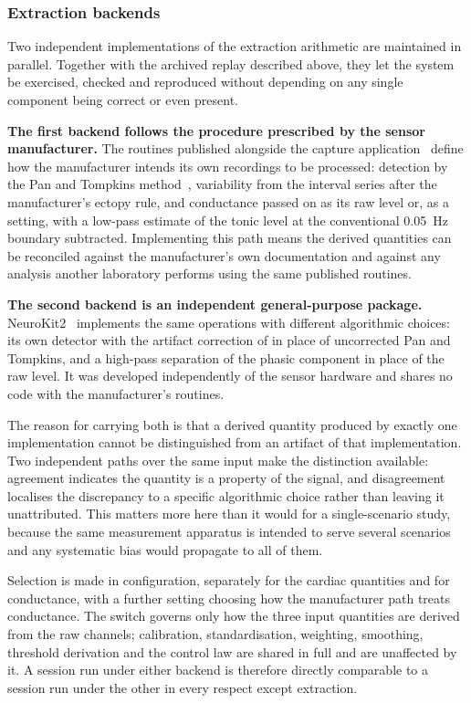 \subsubsection{Extraction backends}
\label{sec:backends}

Two independent implementations of the extraction arithmetic are
maintained in parallel. Together with the archived replay described
above, they let the system be exercised, checked and reproduced
without depending on any single component being correct or even
present.

\textbf{The first backend follows the procedure prescribed by the
sensor manufacturer.} The routines published alongside the
capture application~\citep{plux2020} define how the manufacturer
intends its own recordings to be processed: detection by the Pan
and Tompkins method~\citep{pantompkins1985}, variability from
the interval series after the manufacturer's ectopy rule, and
conductance passed on as its raw level or, as a setting, with a
low-pass estimate of the tonic level at the conventional 0.05~Hz
boundary subtracted. Implementing this path means the
derived quantities can be reconciled against the manufacturer's
own documentation and against any analysis another laboratory
performs using the same published routines.

\textbf{The second backend is an independent general-purpose
package.} NeuroKit2~\citep{makowski2021} implements the same
operations with different algorithmic choices: its own detector
with the artifact correction of \citet{lipponen2019} in place of
uncorrected Pan and Tompkins, and a high-pass separation of the
phasic component in place of the raw level. It was
developed independently of the sensor hardware and shares no code
with the manufacturer's routines.

The reason for carrying both is that a derived quantity produced
by exactly one implementation cannot be distinguished from an
artifact of that implementation. Two independent paths over the
same input make the distinction available: agreement indicates
the quantity is a property of the signal, and disagreement
localises the discrepancy to a specific algorithmic choice rather
than leaving it unattributed. This matters more here than it
would for a single-scenario study, because the same measurement
apparatus is intended to serve several scenarios and any
systematic bias would propagate to all of them.

Selection is made in configuration, separately for the cardiac
quantities and for conductance, with a further setting choosing
how the manufacturer path treats conductance. The switch governs
only how the three input quantities are derived from the raw
channels; calibration, standardisation, weighting, smoothing,
threshold derivation and the control law are shared in full and
are unaffected by it. A session run under either backend is
therefore directly comparable to a session run under the other in
every respect except extraction.

